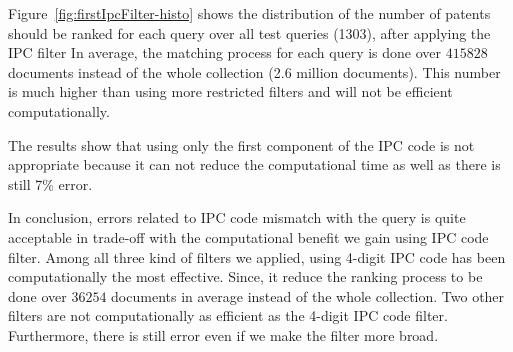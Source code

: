 
Figure~\ref{fig:firstIpcFilter-histo} shows the distribution of the number of patents should be ranked for each query over all test queries (1303), after applying the IPC filter
In average, the matching process for each query is done over $ 415828 $ documents instead of the whole collection (2.6 million documents). This number is much higher than using more restricted filters and will not be efficient computationally. 

The results show that using only the first component of the IPC code is not appropriate because it can not reduce the computational time as well as there is still 7\% error.   

In conclusion, errors related to IPC code mismatch with the query is quite acceptable in trade-off with the computational benefit we gain using IPC code filter. Among all three kind of filters we applied, using 4-digit IPC code has been computationally the most effective. Since, it reduce the ranking process to be done over $ 36254 $ documents in average instead of the whole collection. Two other filters are not computationally as efficient as the 4-digit IPC code filter. Furthermore, there is still error even if we make the filter more broad.

